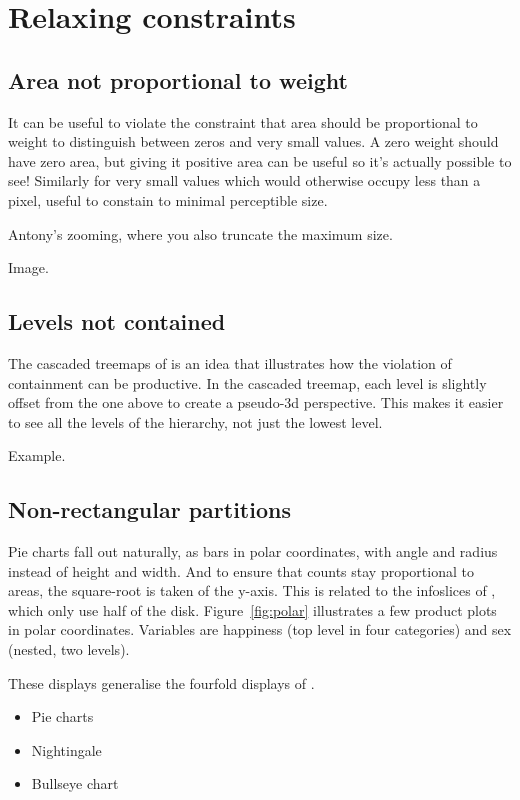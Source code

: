 \documentclass[letterpaper,oneside]{scrartcl}
\begin{document}
\section{Relaxing constraints}
\label{sec:relax}

\subsection{Area not proportional to weight}

It can be useful to violate the constraint that area should be proportional to weight to distinguish between zeros and very small values.  A zero weight should have zero area, but giving it positive area can be useful so it's actually possible to see!  Similarly for very small values which would otherwise occupy less than a pixel, useful to constain to minimal perceptible size.

Antony's zooming, where you also truncate the maximum size.

Image.

\subsection{Levels not contained}

The cascaded treemaps of \citet{lu:2008} is an idea that illustrates how the violation of containment can be productive.  In the cascaded treemap, each level is slightly offset from the one above to create a pseudo-3d perspective.
This makes it easier to see all the levels of the hierarchy, not just the lowest level.

Example.

\subsection{Non-rectangular partitions}

Pie charts fall out naturally, as bars in polar coordinates, with angle and radius instead of height and width. And to ensure that counts stay proportional to areas, the square-root is taken of the y-axis. This is related to the infoslices of \citet{andrews:1998}, which only use half of the disk. Figure~\ref{fig:polar} illustrates a few product plots in polar coordinates.  Variables are happiness (top level in four categories) and sex (nested, two levels).

These displays generalise the fourfold displays of \citet{friendly:1995}. 

\begin{itemize}
  \item Pie charts
  \item Nightingale
  \item Bullseye chart 
\end{itemize}
\end{document}
